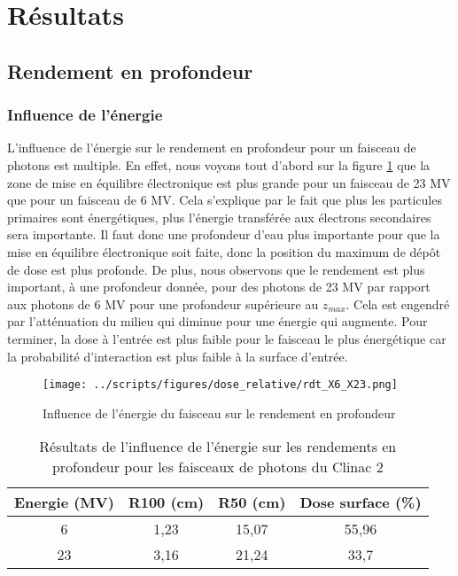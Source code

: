 \documentclass{article}
\begin{document}
\section{Résultats}
\subsection{Rendement en profondeur}
\subsubsection{Influence de l'énergie}

L'influence de l'énergie sur le rendement en profondeur pour un faisceau de photons est multiple. En effet, nous voyons tout d'abord sur la figure \ref*{fig_rdt_energie} que la zone de mise en équilibre électronique est plus grande pour un faisceau de 23 MV que pour un faisceau de 6 MV. Cela s'explique par le fait que plus les particules primaires sont énergétiques, plus l'énergie transférée aux électrons secondaires sera importante. Il faut donc une profondeur d'eau plus importante pour que la mise en équilibre électronique soit faite, donc la position du maximum de dépôt de dose est plus profonde. De plus, nous observons que le rendement est plus important, à une profondeur donnée, pour des photons de 23 MV par rapport aux photons de 6 MV pour une profondeur supérieure au $z_{max}$. Cela est engendré par l'atténuation du milieu qui diminue pour une énergie qui augmente. Pour terminer, la dose à l'entrée est plus faible pour le faisceau le plus énergétique car la probabilité d'interaction est plus faible à la surface d'entrée.

\begin{figure}[h]
  \centering
  \texttt{[image: ../scripts/figures/dose\_relative/rdt\_X6\_X23.png]}
  \caption{Influence de l'énergie du faisceau sur le rendement en profondeur}
  \label{fig_rdt_energie}
\end{figure}

\begin{table}[h]
  \centering
  \begin{tabular}{cccc}
    \toprule
    \textbf{Energie (MV)} & \textbf{R100 (cm)} & \textbf{R50 (cm)} & \textbf{Dose surface (\%)} \\
    \toprule
    6 & 1,23 & 15,07 & 55,96 \\
    23 & 3,16 & 21,24 & 33,7 \\
    \bottomrule
  \end{tabular}
  \caption{Résultats de l'influence de l'énergie sur les rendements en profondeur pour les faisceaux de photons du Clinac 2}
  \label{table_rdt_energie}
\end{table}
\end{document}
